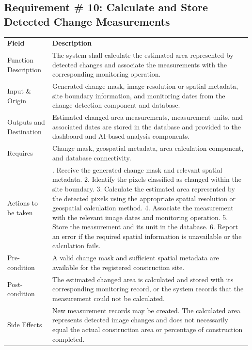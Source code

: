 \documentclass[12pt,a4paper]{report}
\begin{document}
\subsection{Requirement \# 10: Calculate and Store Detected Change
Measurements}\label{requirement-10-calculate-and-store-detected-change-measurements}

\begin{longtable}[]{@{}
  >{\raggedright\arraybackslash}p{}
  >{\raggedright\arraybackslash}p{}@{}}
\toprule\noalign{}
\endhead
\bottomrule\noalign{}
\endlastfoot
\textbf{Field} & \textbf{Description} \\
Function Description & The system shall calculate the estimated area
represented by detected changes and associate the measurements with the
corresponding monitoring operation. \\
Input \& Origin & Generated change mask, image resolution or spatial
metadata, site boundary information, and monitoring dates from the
change detection component and database. \\
Outputs and Destination & Estimated changed-area measurements,
measurement units, and associated dates are stored in the database and
provided to the dashboard and AI-based analysis components. \\
Requires & Change mask, geospatial metadata, area calculation component,
and database connectivity. \\
Actions to be taken & 1. Receive the generated change mask and relevant
spatial metadata. 2. Identify the pixels classified as changed within
the site boundary. 3. Calculate the estimated area represented by the
detected pixels using the appropriate spatial resolution or geospatial
calculation method. 4. Associate the measurement with the relevant image
dates and monitoring operation. 5. Store the measurement and its unit in
the database. 6. Report an error if the required spatial information is
unavailable or the calculation fails. \\
Pre-condition & A valid change mask and sufficient spatial metadata are
available for the registered construction site. \\
Post-condition & The estimated changed area is calculated and stored
with its corresponding monitoring record, or the system records that the
measurement could not be calculated. \\
Side Effects & New measurement records may be created. The calculated
area represents detected image changes and does not necessarily equal
the actual construction area or percentage of construction completed. \\
\end{longtable}
\end{document}
